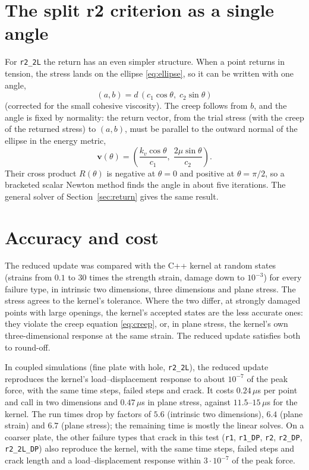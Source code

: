 \documentclass[11pt,a4paper]{article}
\begin{document}
\section{The split r2 criterion as a single angle}
\label{sec:r2}

For \texttt{r2\_2L} the return has an even simpler structure. When a point returns in tension,
the stress lands on the ellipse
\eqref{eq:ellipse}, so it can be written with one angle,
\begin{equation}
  (a,b)=d\,(c_1\cos\theta,\;c_2\sin\theta)
\end{equation}
(corrected for the small cohesive viscosity). The creep follows from $b$, and the angle is fixed
by normality: the return vector, from the trial stress (with the creep of the returned stress)
to $(a,b)$, must be parallel to the outward normal of the ellipse in the energy metric,
\begin{equation}
  \bm{v}(\theta)=\left(\frac{k_v\cos\theta}{c_1},\;\frac{2\mu\sin\theta}{c_2}\right).
\end{equation}
Their cross product $R(\theta)$ is negative at
$\theta=0$ and positive at $\theta=\pi/2$, so a bracketed scalar Newton method finds the angle in
about five iterations. The general solver of Section~\ref{sec:return} gives the same result.

\section{Accuracy and cost}

The reduced update was compared with the C++ kernel at random states (strains from $0.1$ to
$30$ times the strength strain, damage down to $10^{-3}$) for every failure type, in intrinsic
two dimensions, three dimensions and plane stress. The stress agrees to the kernel's tolerance.
Where the two differ, at strongly damaged points with large openings, the kernel's accepted
states are the less accurate ones: they violate the creep equation \eqref{eq:creep}, or, in plane
stress, the kernel's own three-dimensional response at the same strain. The reduced update
satisfies both to round-off.

In coupled simulations (fine plate with hole, \texttt{r2\_2L}), the reduced update reproduces the
kernel's load--displacement response to about $10^{-7}$ of the peak force, with the same time
steps, failed steps and crack. It costs $0.24\,\mu$s per point and call in two dimensions and
$0.47\,\mu$s in plane stress, against $11.5$--$15\,\mu$s for the kernel. The run times drop by
factors of $5.6$ (intrinsic two dimensions), $6.4$ (plane strain) and $6.7$ (plane stress); the
remaining time is mostly the linear solves. On a coarser plate, the other failure types that
crack in this test (\texttt{r1}, \texttt{r1\_DP}, \texttt{r2}, \texttt{r2\_DP},
\texttt{r2\_2L\_DP}) also reproduce the kernel, with the same time steps, failed steps and crack
length and a load--displacement response within $3\cdot10^{-7}$ of the peak force.
\end{document}
